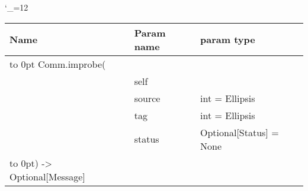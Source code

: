 \begingroup \catcode`\_=12 \tt
\begin{tabular}{lll}
\toprule
\textrm{Name}&\textrm{Param name}&\textrm{param type}\\
\midrule
\hbox to 0pt {Comm.improbe(\hss}\\
& self\\
& source & int = Ellipsis\\
& tag & int = Ellipsis\\
& status & Optional[Status] = None\\
\hbox to 0pt{) -> Optional[Message]\hss}\\
\bottomrule
\end{tabular}
\endgroup
